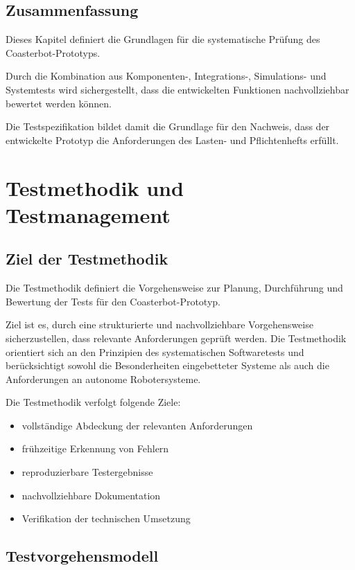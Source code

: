 \documentclass[
  a4paper,
  12pt,
  DIV=12,        %
  parskip=half,  %
  headings=small %
]{scrartcl}
\theoremstyle{definition}
\providecommand{\tightlist}{%
  \setlength{\itemsep}{0pt}\setlength{\parskip}{0pt}}
\theoremstyle{definition}
\begin{document}
\subsection{Zusammenfassung}\label{zusammenfassung}

Dieses Kapitel definiert die Grundlagen für die systematische Prüfung
des Coasterbot-Prototyps.

Durch die Kombination aus Komponenten-, Integrations-, Simulations- und
Systemtests wird sichergestellt, dass die entwickelten Funktionen
nachvollziehbar bewertet werden können.

Die Testspezifikation bildet damit die Grundlage für den Nachweis, dass
der entwickelte Prototyp die Anforderungen des Lasten- und
Pflichtenhefts erfüllt.

\section{Testmethodik und
Testmanagement}\label{testmethodik-und-testmanagement}

\subsection{Ziel der Testmethodik}\label{ziel-der-testmethodik}

Die Testmethodik definiert die Vorgehensweise zur Planung, Durchführung
und Bewertung der Tests für den Coasterbot-Prototyp.

Ziel ist es, durch eine strukturierte und nachvollziehbare
Vorgehensweise sicherzustellen, dass relevante Anforderungen geprüft
werden. Die Testmethodik orientiert sich an den Prinzipien des
systematischen Softwaretests und berücksichtigt sowohl die
Besonderheiten eingebetteter Systeme als auch die Anforderungen an
autonome Robotersysteme.

Die Testmethodik verfolgt folgende Ziele:

\begin{itemize}
\tightlist
\item
  vollständige Abdeckung der relevanten Anforderungen
\item
  frühzeitige Erkennung von Fehlern
\item
  reproduzierbare Testergebnisse
\item
  nachvollziehbare Dokumentation
\item
  Verifikation der technischen Umsetzung
\end{itemize}

\subsection{Testvorgehensmodell}\label{testvorgehensmodell}
\end{document}
